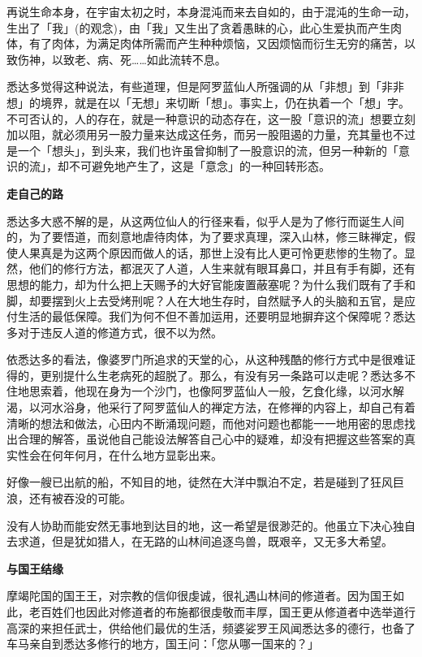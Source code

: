 \documentclass[twoside,openany]{book}
\newcommand{\mt}[1]{\textbullet \textbf{#1}}
\begin{document}
再说生命本身，在宇宙太初之时，本身混沌而来去自如的，由于混沌的生命一动，生出了「我」(的观念)，由「我」又生出了贪着愚眛的心，此心生爱执而产生肉体，有了肉体，为满足肉体所需而产生种种烦恼，又因烦恼而衍生无穷的痛苦，以致伤神，以致老、病、死……如此流转不息。

悉达多觉得这种说法，有些道理，但是阿罗蓝仙人所强调的从「非想」到「非非想」的境界，就是在以「无想」来切断「想」。事实上，仍在执着一个「想」字。不可否认的，人的存在，就是一种意识的动态存在，这一股「意识的流」想要立刻加以阻，就必须用另一股力量来达成这任务，而另一股阻遏的力量，充其量也不过是一个「想头」，到头来，我们也许虽曾抑制了一股意识的流，但另一种新的「意识的流」，却不可避免地产生了，这是「意念」的一种回转形态。

\mt{走自己的路}

悉达多大惑不解的是，从这两位仙人的行径来看，似乎人是为了修行而诞生人间的，为了要悟道，而刻意地虐待肉体，为了要求真理，深入山林，修三眛禅定，假使人果真是为这两个原因而做人的话，那世上没有比人更可怜更悲惨的生物了。显然，他们的修行方法，都泯灭了人道，人生来就有眼耳鼻口，并且有手有脚，还有思想的能力，却为什么把上天赐予的大好官能废置蔽塞呢？为什么我们既有了手和脚，却要摆到火上去受烤刑呢？人在大地生存时，自然赋予人的头脑和五官，是应付生活的最低保障。我们为何不但不善加运用，还要明显地摒弃这个保障呢？悉达多对于违反人道的修道方式，很不以为然。

依悉达多的看法，像婆罗门所追求的天堂的心，从这种残酷的修行方式中是很难证得的，更别提什么生老病死的超脱了。那么，有没有另一条路可以走呢？悉达多不住地思索着，他现在身为一个沙门，也像阿罗蓝仙人一般，乞食化缘，以河水解渴，以河水浴身，他采行了阿罗蓝仙人的禅定方法，在修禅的内容上，却自己有着清晰的想法和做法，心田内不断涌现问题，而他对问题也都能一一地用密的思虑找出合理的解答，虽说他自己能设法解答自己心中的疑难，却没有把握这些答案的真实性会在何年何月，在什么地方显彰出来。

好像一艘已出航的船，不知目的地，徒然在大洋中飘泊不定，若是碰到了狂风巨浪，还有被吞没的可能。

没有人协助而能安然无事地到达目的地，这一希望是很渺茫的。他虽立下决心独自去求道，但是犹如猎人，在无路的山林间追逐鸟兽，既艰辛，又无多大希望。

\mt{与国王结缘}

摩竭陀国的国王王，对宗教的信仰很虔诚，很礼遇山林间的修道者。因为国王如此，老百姓们也因此对修道者的布施都很虔敬而丰厚，国王更从修道者中选举道行高深的来担任武士，供给他们最优的生活，频婆娑罗王风闻悉达多的德行，也备了车马亲自到悉达多修行的地方，国王问：「您从哪一国来的？」
\end{document}
